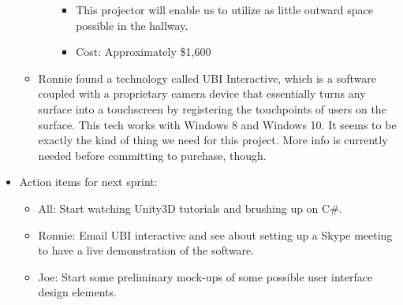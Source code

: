 \documentclass[]{article}
\begin{document}
\begin{itemize}
\begin{itemize}
\begin{itemize}
\begin{itemize}
							\item This projector will enable us to utilize as little outward space possible in the hallway. 
							\item Cost: Approximately \$1,600
						\end{itemize}
				\end{itemize}
			\item Ronnie found a technology called UBI Interactive, which is a software coupled with a proprietary camera device that essentially turns any surface into a touchscreen by registering the touchpoints of users on the surface. This tech works with Windows 8 and Windows 10. It seems to be exactly the kind of thing we need for this project. More info is currently needed before committing to purchase, though.
		\end{itemize}
		\item Action items for next sprint:
			\begin{itemize}
				\item All: Start watching Unity3D tutorials and brushing up on C\#.
				\item Ronnie: Email UBI interactive and see about setting up a Skype meeting to have a live demonstration of the software.
				\item Joe: Start some preliminary mock-ups of some possible user interface design elements. 
			\end{itemize}
\end{itemize}
\end{document}
